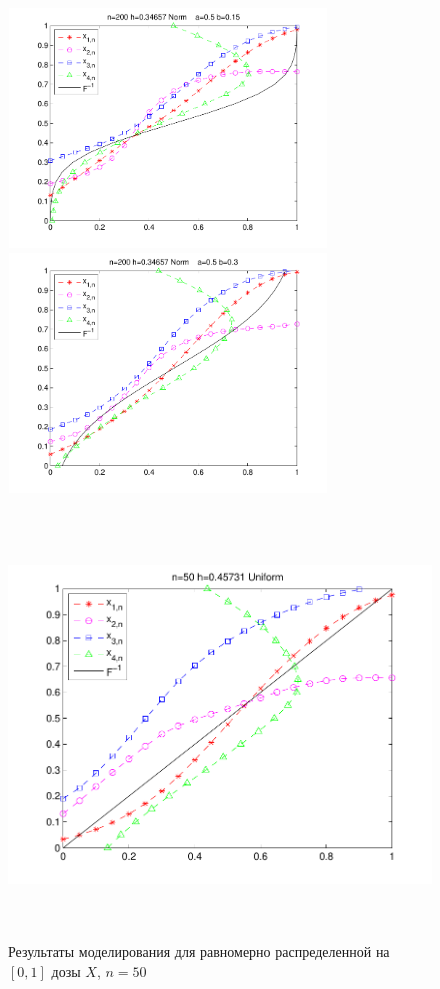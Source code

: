 \documentclass[a4paper,14pt,russian]{article}
\begin{document}
\begin{figure}[p]
\includegraphics[width = 240pt,height = 180pt]{13n.pdf}
\includegraphics[width = 240pt,height = 180pt]{14n.pdf}
\end{figure}

\newpage


\begin{figure}[ht]
\center
\caption{Результаты моделирования для равномерно распределенной на $[0,1]$ дозы $X$, $n = 50$}
\includegraphics[width = 400pt,height = 320pt]{1.pdf}
\end{figure}
\end{document}
